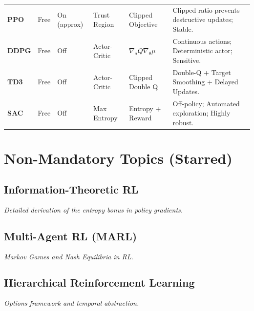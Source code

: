 \documentclass[11pt]{article}
\begin{document}
\begin{landscape}
\begin{center}
\begin{longtable}{>{\bfseries}p{2.8cm} p{1.8cm} p{1.8cm} p{2.2cm} p{4cm} p{6cm}}
PPO & Free & On (approx) & Trust Region & Clipped Objective & Clipped ratio prevents destructive updates; Stable. \\
DDPG & Free & Off & Actor-Critic & $\nabla_a Q \nabla_\theta \mu$ & Continuous actions; Deterministic actor; Sensitive. \\
TD3 & Free & Off & Actor-Critic & Clipped Double Q & Double-Q + Target Smoothing + Delayed Updates. \\
SAC & Free & Off & Max Entropy & Entropy + Reward & Off-policy; Automated exploration; Highly robust. \\ \bottomrule
\end{longtable}
\end{center}
\end{landscape}

\appendix
\section{Non-Mandatory Topics (Starred)}

\subsection{Information-Theoretic RL}
\textit{Detailed derivation of the entropy bonus in policy gradients.}

\subsection{Multi-Agent RL (MARL)}
\textit{Markov Games and Nash Equilibria in RL.}

\subsection{Hierarchical Reinforcement Learning}
\textit{Options framework and temporal abstraction.}
\end{document}
